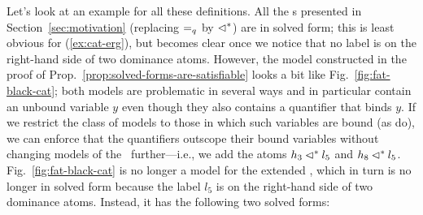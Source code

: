 Let's look at an example for all these definitions.  All the \rmrs s
presented in Section~\ref{sec:motivation} (replacing $=_q$ by $\lhd^*$)
are in solved form; this is least obvious for (\ref{ex:cat-erg}), but
becomes clear once we notice that no label is on the right-hand side
of two dominance atoms.  However, the model constructed in the proof
of Prop.~\ref{prop:solved-forms-are-satisfiable} looks a bit like
Fig.~\ref{fig:fat-black-cat}; both models are problematic in several
ways and in particular contain an unbound variable $y$ even though
they also contains a quantifier that binds $y$.  If we restrict the
class of models to those in which such variables are bound (as
 do), we can enforce that the quantifiers
outscope their bound variables without changing models of the \rmrs\
further---i.e., we add the atoms $h_3 \lhd^* l_5$ and $h_8 \lhd^* l_5$.
Fig.~\ref{fig:fat-black-cat} is no longer a model for the extended
\rmrs, which in turn is no longer in solved form because the label
$l_5$ is on the right-hand side of two dominance atoms.  Instead, it
has the following two solved forms:

